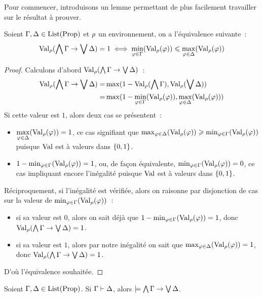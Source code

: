 Pour commencer, introduisons un lemme permettant de plus facilement travailler
sur le résultat à prouver.

\begin{lemma}\label{lem.cor.uti}
  Soient $\Gamma,\Delta\in\operatorname{List}(\operatorname{Prop})$ et $\rho$ un environnement, on a
  l'équivalence suivante~:
  \[ \operatorname{Val}_{\rho}(\bigwedge\Gamma\to\bigvee\Delta) = 1 \iff
  \min_{\varphi\in\Gamma}(\operatorname{Val}_{\rho}(\varphi)) \leqslant \max_{\varphi\in\Delta}(\operatorname{Val}_{\rho}(\varphi))\]
\end{lemma}

\begin{proof}
  Calculons d'abord $\operatorname{Val}_{\rho}(\bigwedge\Gamma\to\bigvee\Delta)$~:
  \begin{align*}
    \operatorname{Val}_{\rho}(\bigwedge\Gamma\to\bigvee\Delta) =&
    \max(1 - \operatorname{Val}_{\rho}(\bigwedge\Gamma), \operatorname{Val}_{\rho}(\bigvee\Delta))\\
    =& \max(1 - \min_{\varphi\in \Gamma}(\operatorname{Val}_{\rho}(\varphi)),
    \max_{\varphi\in\Delta}(\operatorname{Val}_{\rho}(\varphi)))
  \end{align*}
  Si cette valeur est $1$, alors deux cas se présentent~:
  \begin{itemize}
  \item $\displaystyle\max_{\varphi \in \Delta}(\operatorname{Val}_{\rho}(\varphi)) = 1$,
    ce cas signifiant que
    $\max_{\varphi\in \Delta}(\operatorname{Val}_{\rho}(\varphi))\geqslant\min_{\varphi\in \Gamma}(\operatorname{Val}_{\rho}(\varphi))$
    puisque $\operatorname{Val}$ est à valeurs dans $\{0,1\}$.
  \item $1 - \min_{\varphi \in \Gamma}(\operatorname{Val}_{\rho}(\varphi)) = 1$, ou,
    de façon équivalente,
    $\min_{\varphi\in \Gamma}(\operatorname{Val}_{\rho}(\varphi)) = 0$, ce cas impliquant encore
    l'inégalité
    puisque $\operatorname{Val}$ est à valeurs dans $\{0,1\}$.
  \end{itemize}
  Réciproquement, si l'inégalité est vérifiée, alors on raisonne par disjonction
  de cas sur la valeur de $\min_{\varphi\in\Gamma}(\operatorname{Val}_{\rho}(\varphi))$~:
  \begin{itemize}
  \item si sa valeur est $0$, alors on sait déjà que
    $1 - \min_{\varphi \in \Gamma}(\operatorname{Val}_{\rho}(\varphi)) = 1$, donc
    $\operatorname{Val}_{\rho}(\bigwedge \Gamma\to \bigvee \Delta) = 1$.
  \item si sa valeur est $1$, alors par notre inégalité on sait que
    $\max_{\varphi\in\Delta}(\operatorname{Val}_{\rho}(\varphi)) = 1$, donc
    $\operatorname{Val}_{\rho}(\bigwedge \Gamma\to \bigvee \Delta) = 1$.
  \end{itemize}

  D'où l'équivalence souhaitée.
\end{proof}

\begin{theorem}\label{thm.cor.logprop}
  Soient $\Gamma,\Delta\in\operatorname{List}(\operatorname{Prop})$. Si $\Gamma\vdash\Delta$, alors
  $\models \bigwedge \Gamma\to \bigvee \Delta$.
\end{theorem}

